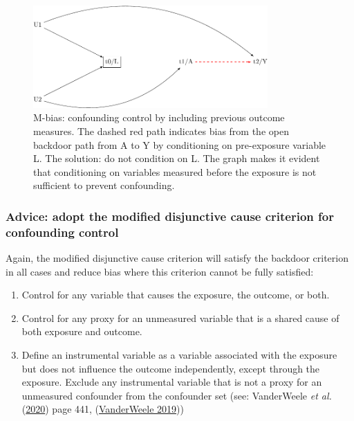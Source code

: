 \documentclass[
  singlecolumn]{article}
\providecommand{\tightlist}{%
  \setlength{\itemsep}{0pt}\setlength{\parskip}{0pt}}\usepackage{longtable,booktabs,array}
\begin{document}
\begin{figure}

{\centering \includegraphics[width=0.8\textwidth,height=\textheight]{causal-dags_files/figure-pdf/fig-m-bias-1.pdf}

}

\caption{\label{fig-m-bias}M-bias: confounding control by including
previous outcome measures. The dashed red path indicates bias from the
open backdoor path from A to Y by conditioning on pre-exposure variable
L. The solution: do not condition on L. The graph makes it evident that
conditioning on variables measured before the exposure is not sufficient
to prevent confounding.}

\end{figure}

\hypertarget{advice-adopt-the-modified-disjunctive-cause-criterion-for-confounding-control}{%
\subsubsection{Advice: adopt the modified disjunctive cause criterion
for confounding
control}\label{advice-adopt-the-modified-disjunctive-cause-criterion-for-confounding-control}}

Again, the modified disjunctive cause criterion will satisfy the
backdoor criterion in all cases and reduce bias where this criterion
cannot be fully satisfied:

\begin{enumerate}
\def\labelenumi{\alph{enumi}.}
\tightlist
\item
  Control for any variable that causes the exposure, the outcome, or
  both.
\item
  Control for any proxy for an unmeasured variable that is a shared
  cause of both exposure and outcome.
\item
  Define an instrumental variable as a variable associated with the
  exposure but does not influence the outcome independently, except
  through the exposure. Exclude any instrumental variable that is not a
  proxy for an unmeasured confounder from the confounder set (see:
  VanderWeele \emph{et al.}
  (\protect\hyperlink{ref-vanderweele2020}{2020}) page 441,
  (\protect\hyperlink{ref-vanderweele2019}{VanderWeele 2019}))
\end{enumerate}
\end{document}
